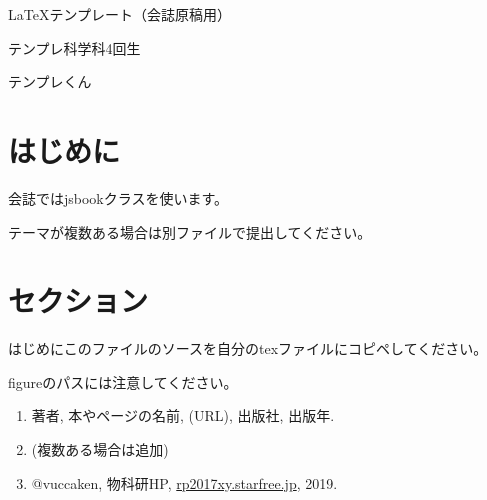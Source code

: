 \documentclass[10pt,b5paper,papersize,dvipdfmx]{jsbook}
\begin{document}




\kaishititle%

  {\LaTeX テンプレート（会誌原稿用）}%

  {テンプレ科学科4回生}%

  {テンプレくん}%









%

\section*{はじめに}

会誌ではjsbookクラスを使います。\par

テーマが複数ある場合は別ファイルで提出してください。



%

\section{セクション}

はじめにこのファイルのソースを自分のtexファイルにコピペしてください。\par

figureのパスには注意してください。












\begin{sanko}

  \begin{enumerate}

    \item 著者, 本やページの名前, (URL), 出版社, 出版年.

    \item (複数ある場合は追加)

    \item @vuccaken, 物科研HP, \url{rp2017xy.starfree.jp}, 2019.

  \end{enumerate}

\end{sanko}
\end{document}
